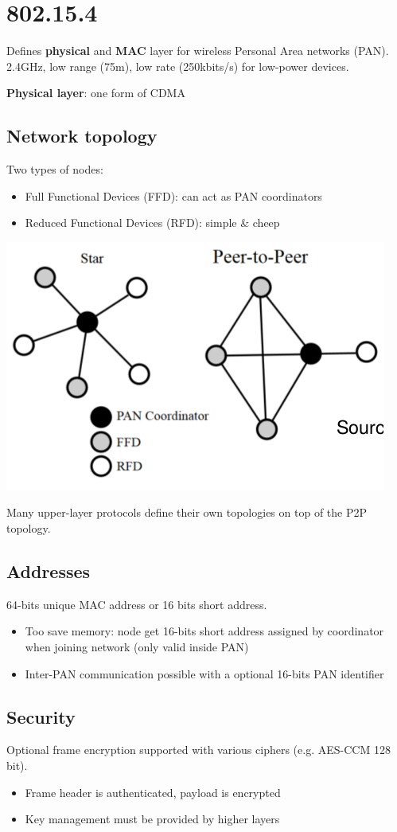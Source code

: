 
\section{802.15.4}

Defines \textbf{physical} and \textbf{MAC} layer for wireless Personal Area
networks (PAN). 2.4GHz, low range (75m), low rate (250kbits/s) for
low-power devices.

\textbf{Physical layer}: one form of CDMA

\subsection{Network topology}
Two types of nodes:
\begin{itemize}
    \item Full Functional Devices (FFD): can act as PAN coordinators
    \item Reduced Functional Devices (RFD): simple \& cheep
\end{itemize}
\begin{center}
    \includegraphics[width=0.5\linewidth]{img/802_topo.png}
\end{center}
Many upper-layer protocols define their own topologies
on top of the P2P topology.

\subsection{Addresses}
64-bits unique MAC address or 16 bits short address.
\begin{itemize}
    \item Too save memory: node get 16-bits short address
        assigned by coordinator when joining network (only
        valid inside PAN)
    \item Inter-PAN communication possible with a
        optional 16-bits PAN identifier
\end{itemize}

\subsection{Security}
Optional frame encryption supported with various
ciphers (e.g. AES-CCM 128 bit).
\begin{itemize}
    \item Frame header is authenticated, payload is encrypted
    \item Key management must be provided by higher layers
\end{itemize}

